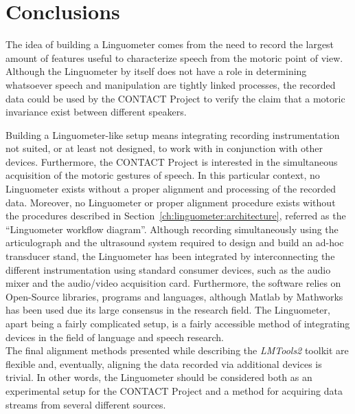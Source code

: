 \section{Conclusions}
\label{ch:conclusions}
The idea of building a Linguometer comes from the need to record the largest
amount of features useful to characterize speech from the motoric point of view.
Although the Linguometer by itself does not have a role in determining
whatsoever speech and manipulation are tightly linked processes, the recorded 
data could be used by the CONTACT Project to verify the claim that a motoric
invariance exist between different speakers.

Building a Linguometer-like setup means integrating recording instrumentation
not suited, or at least not designed, to work with in conjunction with 
other devices.
Furthermore, the CONTACT Project is interested in the simultaneous acquisition
of the motoric gestures of speech.
In this particular context, no Linguometer exists without a proper alignment and
processing of the recorded data.
Moreover, no Linguometer or proper alignment procedure exists without the 
procedures described in Section~\ref{ch:linguometer:architecture}, referred 
as the ``Linguometer workflow diagram''.
Although recording simultaneously using the articulograph and the ultrasound
system required to design and build an ad-hoc transducer stand, the Linguometer 
has been integrated by interconnecting the different instrumentation using
standard consumer devices, such as the audio mixer and the audio/video
acquisition card.
Furthermore, the software relies on Open-Source libraries,
programs and languages, although Matlab by Mathworks has been used due its large
consensus in the research field.
The
Linguometer, apart being a fairly complicated setup, is a fairly accessible
method of integrating devices in the field of language and speech research.\\
The final alignment methods presented while describing the \emph{LMTools2}
toolkit are flexible and, eventually, aligning the data recorded via additional
devices  is trivial.
In other words, the Linguometer should be considered both as an experimental
setup for the CONTACT Project and a method for acquiring data streams from 
several different sources.

